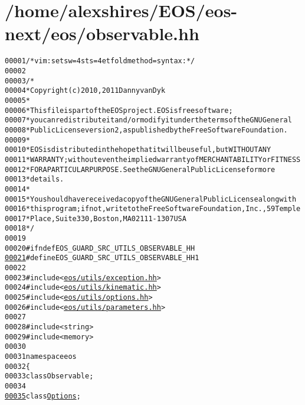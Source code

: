 \hypertarget{observable_8hh_source}{
\section{/home/alexshires/EOS/eos-\/next/eos/observable.hh}
}


\begin{footnotesize}\begin{alltt}
00001 \textcolor{comment}{/* vim: set sw=4 sts=4 et foldmethod=syntax : */}
00002 
00003 \textcolor{comment}{/*}
00004 \textcolor{comment}{ * Copyright (c) 2010, 2011 Danny van Dyk}
00005 \textcolor{comment}{ *}
00006 \textcolor{comment}{ * This file is part of the EOS project. EOS is free software;}
00007 \textcolor{comment}{ * you can redistribute it and/or modify it under the terms of the GNU General}
00008 \textcolor{comment}{ * Public License version 2, as published by the Free Software Foundation.}
00009 \textcolor{comment}{ *}
00010 \textcolor{comment}{ * EOS is distributed in the hope that it will be useful, but WITHOUT ANY}
00011 \textcolor{comment}{ * WARRANTY; without even the implied warranty of MERCHANTABILITY or FITNESS}
00012 \textcolor{comment}{ * FOR A PARTICULAR PURPOSE.  See the GNU General Public License for more}
00013 \textcolor{comment}{ * details.}
00014 \textcolor{comment}{ *}
00015 \textcolor{comment}{ * You should have received a copy of the GNU General Public License along with}
00016 \textcolor{comment}{ * this program; if not, write to the Free Software Foundation, Inc., 59 Temple}
00017 \textcolor{comment}{ * Place, Suite 330, Boston, MA  02111-1307  USA}
00018 \textcolor{comment}{ */}
00019 
00020 \textcolor{preprocessor}{#ifndef EOS\_GUARD\_SRC\_UTILS\_OBSERVABLE\_HH}
\hypertarget{observable_8hh_source_l00021}{}\hyperlink{observable_8hh_ac8ede094dc6ddf4b3b10feb4fef33910}{00021} \textcolor{preprocessor}{}\textcolor{preprocessor}{#define EOS\_GUARD\_SRC\_UTILS\_OBSERVABLE\_HH 1}
00022 \textcolor{preprocessor}{}
00023 \textcolor{preprocessor}{#include <\hyperlink{exception_8hh}{eos/utils/exception.hh}>}
00024 \textcolor{preprocessor}{#include <\hyperlink{kinematic_8hh}{eos/utils/kinematic.hh}>}
00025 \textcolor{preprocessor}{#include <\hyperlink{options_8hh}{eos/utils/options.hh}>}
00026 \textcolor{preprocessor}{#include <\hyperlink{parameters_8hh}{eos/utils/parameters.hh}>}
00027 
00028 \textcolor{preprocessor}{#include <string>}
00029 \textcolor{preprocessor}{#include <memory>}
00030 
00031 \textcolor{keyword}{namespace }eos
00032 \{
00033     \textcolor{keyword}{class }Observable;
00034 
\hypertarget{observable_8hh_source_l00035}{}\hyperlink{namespaceeos_a470e5dd806bd129080f1aa0c2954646f}{00035}     \textcolor{keyword}{class }\hyperlink{classeos_1_1Options}{Options};

\end{alltt}
\end{footnotesize}

